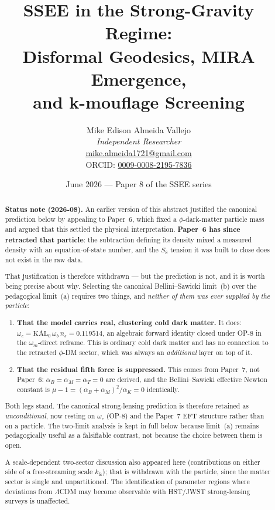 \documentclass[12pt,a4paper]{article}
\title{\textbf{SSEE in the Strong-Gravity Regime:\\
       Disformal Geodesics, MIRA Emergence,\\
       and k-mouflage Screening}}
\author{Mike Edison Almeida Vallejo \\
\small \textit{Independent Researcher} \\
\small \href{mailto:mike.almeida1721@gmail.com}{mike.almeida1721@gmail.com} \\
\small ORCID: \href{https://orcid.org/0009-0008-2195-7836}{0009-0008-2195-7836}
}
\date{June 2026 --- Paper 8 of the SSEE series}
\begin{document}
\maketitle

\begin{abstract}
\noindent \textbf{Status note (2026-08).} An earlier version of this abstract
justified the canonical prediction below by appealing to Paper~6, which fixed
a $\phi$-dark-matter particle mass and argued that this settled the physical
interpretation. \textbf{Paper~6 has since retracted that particle}: the
subtraction defining its density mixed a measured density with an
equation-of-state number, and the $S_8$ tension it was built to close does not
exist in the raw data.

That justification is therefore withdrawn --- but the prediction is not, and it
is worth being precise about why. Selecting the canonical Bellini--Sawicki
limit~(b) over the pedagogical limit~(a) requires two things, and \emph{neither
of them was ever supplied by the particle}:

\begin{enumerate}\itemsep2pt
  \item \textbf{That the model carries real, clustering cold dark matter.} It
        does: $\omega_c=\mathrm{KAL}_0\,\omega_b\,n_s=0.119514$, an algebraic
        forward identity closed under OP-8 in the $\omega_m$-direct reframe.
        This is ordinary cold dark matter and has no connection to the
        retracted $\phi$-DM sector, which was always an \emph{additional} layer
        on top of it.
  \item \textbf{That the residual fifth force is suppressed.} This comes from
        Paper~7, not Paper~6: $\alpha_B=\alpha_M=\alpha_T=0$ are derived, and
        the Bellini--Sawicki effective Newton constant is
        $\mu-1=(\alpha_B+\alpha_M)^2/\alpha_K=0$ identically.
\end{enumerate}

Both legs stand. The canonical strong-lensing prediction is therefore retained
as \emph{unconditional}, now resting on $\omega_c$ (OP-8) and the Paper~7 EFT
structure rather than on a particle. The two-limit analysis is kept in full
below because limit~(a) remains pedagogically useful as a falsifiable contrast,
not because the choice between them is open.

A scale-dependent two-sector discussion also appeared here (contributions on
either side of a free-streaming scale $k_{\mathrm{fs}}$); that is withdrawn with
the particle, since the matter sector is single and unpartitioned. The
identification of parameter regions where deviations from $\Lambda$CDM may
become observable with HST/JWST strong-lensing surveys is unaffected.
\end{abstract}
\end{document}
